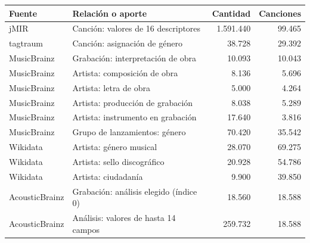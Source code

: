 \begin{center}\small
{}\label{tab:aportes}
\begin{tabularx}{\linewidth}{@{}p{2.7cm} Y r r@{}}
\toprule
\textbf{Fuente} & \textbf{Relación o aporte} & \textbf{Cantidad} & \textbf{Canciones} \\
\midrule
jMIR & Canción: valores de 16 descriptores & 1.591.440 & 99.465 \\
tagtraum & Canción: asignación de género & 38.728 & 29.392 \\
MusicBrainz & Grabación: interpretación de obra & 10.093 & 10.043 \\
MusicBrainz & Artista: composición de obra & 8.136 & 5.696 \\
MusicBrainz & Artista: letra de obra & 5.000 & 4.264 \\
MusicBrainz & Artista: producción de grabación & 8.038 & 5.289 \\
MusicBrainz & Artista: instrumento en grabación & 17.640 & 3.816 \\
MusicBrainz & Grupo de lanzamientos: género & 70.420 & 35.542 \\
Wikidata & Artista: género musical & 28.070 & 69.275 \\
Wikidata & Artista: sello discográfico & 20.928 & 54.786 \\
Wikidata & Artista: ciudadanía & 9.900 & 39.850 \\
AcousticBrainz & Grabación: análisis elegido (índice 0) & 18.560 & 18.588 \\
AcousticBrainz & Análisis: valores de hasta 14 campos & 259.732 & 18.588 \\
\bottomrule
\end{tabularx}
\end{center}
